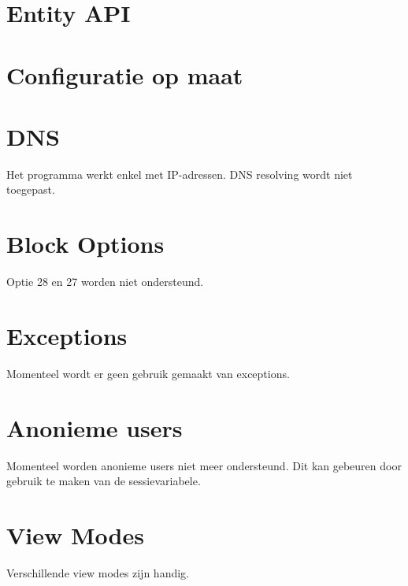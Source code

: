 \section{Entity API} \label{entityAPI}

\section{Configuratie op maat} \label{configuratie}


\section{DNS}
Het programma werkt enkel met IP-adressen. DNS resolving wordt niet toegepast.

\section{Block Options} \label{unsupportedBlockOptions}
Optie 28 en 27 worden niet ondersteund.

\section{Exceptions}
Momenteel wordt er geen gebruik gemaakt van exceptions.

\section{Anonieme users}
Momenteel worden anonieme users niet meer ondersteund. Dit kan gebeuren door gebruik te maken van de sessievariabele.

\section{View Modes}
Verschillende view modes zijn handig.